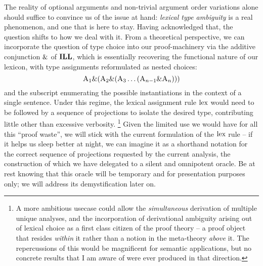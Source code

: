 The reality of optional arguments and non-trivial argument order variations alone should suffice to convince us of the issue at hand: \textit{lexical type ambiguity} is a real phenomenon, and one that is here to stay.
Having acknowledged that, the question shifts to how we deal with it.
From a theoretical perspective, we can incorporate the question of type choice into our proof-machinery via the additive conjunction ${\&}$ of $\textbf{ILL}$, which is essentially recovering the functional nature of our lexicon, with type assignments reformulated as nested choices:
\[
 \smallprop{A}_1 \with (\smallprop{A}_2 \with (\smallprop{A}_3 \dots (\smallprop{A}_{n-1}\with\smallprop{A}_{n})))
\]
and the subscript enumerating the possible instantiations in the context of a single sentence.
Under this regime, the lexical assignment rule $\mathrm{lex}$ would need to be followed by a sequence of projections to isolate the desired type, contributing little other than excessive verbosity.%
\footnote{
A more ambitious usecase could allow the \textit{simultaneous} derivation of multiple unique analyses, and the incorporation of derivational ambiguity arising out of lexical choice as a first class citizen of the proof theory -- a proof object that resides \textit{within} it rather than a notion in the meta-theory \textit{above} it.
The repercussions of this would be magnificent for semantic applications, but no concrete results that I am aware of were ever produced in that direction.}
Given the limited use we would have for all this ``proof waste'', we will stick with the current formulation of the $\mathrm{lex}$ rule -- if it helps us sleep better at night, we can imagine it as a shorthand notation for the correct sequence of projections requested by the current analysis, the construction of which we have delegated to a silent and omnipotent oracle.
Be at rest knowing that this oracle will be temporary and for presentation purposes only; we will address its demystification later on.

